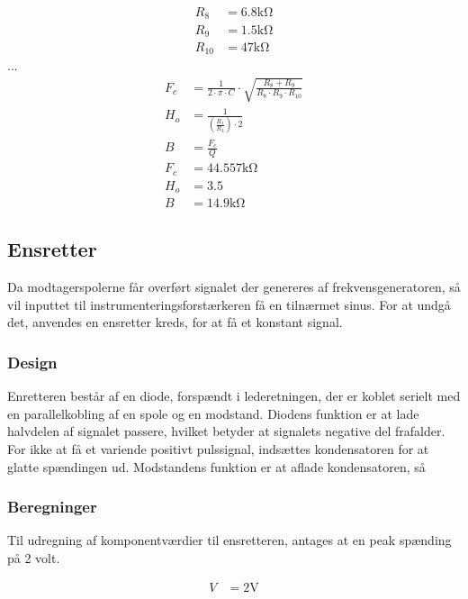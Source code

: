\begin{align}
	R_8 & = 6.8 \si{\kilo\ohm} \nonumber \\
	R_9 & = 1.5 \si{\kilo\ohm} \nonumber \\
	R_{10} & = 47 \si{\kilo\ohm} \nonumber
\end{align}
...
\begin{align}
	F_c & = \frac{1}{2 \cdot \pi \cdot C} \cdot \sqrt{\frac{R_8+R_9}{R_8 \cdot R_9 \cdot R_{10}}} \\
	H_o & = \frac{1}{\left( \frac{R_1}{R_3} \right) \cdot 2} \\
	B & = \frac{F_c}{Q} \\
	F_c & = 44.557 \si{\kilo\ohm} \nonumber \\
	H_o & = 3.5 \nonumber \\
	B & = 14.9 \si{\kilo\ohm} \nonumber
\end{align}

\subsection{Ensretter}
Da modtagerspolerne får overført signalet der genereres af frekvensgeneratoren, så vil inputtet til instrumenteringsforstærkeren få en tilnærmet sinus. 
For at undgå det, anvendes en ensretter kreds, for at få et konstant signal.

\subsubsection{Design}
Enretteren består af en diode, forspændt i lederetningen, der er koblet serielt med en parallelkobling af en spole og en modstand. 
Diodens funktion er at lade halvdelen af signalet passere, hvilket betyder at signalets negative del frafalder. 
For ikke at få et variende positivt pulssignal, indsættes kondensatoren for at glatte spændingen ud. Modstandens funktion er at aflade kondensatoren, så



\subsubsection{Beregninger}
Til udregning af komponentværdier til ensretteren, antages at en peak spænding på 2 volt.

\begin{align}
	V & = 2 \si{\volt} \nonumber
\end{align}

